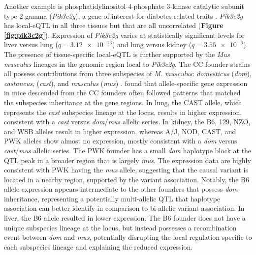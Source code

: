 \documentclass[9pt,twocolumn,twoside]{gsajnl}
\begin{document}
Another example is phosphatidylinositol-4-phosphate 3-kinase catalytic subunit type 2 gamma (\textit{Pik3c2g}), a gene of interest for diabetes-related traits \citep{Braccini2015}. \textit{Pik3c2g} has local-eQTL in all three tissues but that are all uncorrelated (\textbf{Figure \ref{fig:pik3c2g}}). Expression of \textit{Pik3c2g} varies at statistically significant levels for liver versus lung ($q = \num{3.12e-13}$) and lung versus kidney ($q = \num{3.55e-6}$). The presence of tissue-specific local-eQTL is further supported by the \textit{Mus musculus} lineages in the genomic region local to \textit{Pik3c2g}. The CC founder strains all possess contributions from three subspecies of \textit{M. musculus}: \textit{domesticus} (\textit{dom}), \textit{castaneus}, (\textit{cast}), and \textit{musculus} (\textit{mus}) \citep{Yang2011}. \cite{Crowley2015} found that allele-specific gene expression in mice descended from the CC founders often followed patterns that matched the subspecies inheritance at the gene regions.
In lung, the CAST allele, which represents the \textit{cast} subspecies lineage at the locus, results in higher expression, consistent with a \textit{cast} versus \textit{dom}/\textit{mus} allelic series. In kidney, the B6, 129, NZO, and WSB alleles result in higher expression, whereas A/J, NOD, CAST, and PWK alleles show almost no expression, mostly consistent with a \textit{dom} versus \textit{cast}/\textit{mus} allelic series. The PWK founder has a small \textit{dom} haplotype block at the QTL peak in a broader region that is largely \textit{mus}. The expression data are highly consistent with PWK having the \textit{mus} allele, suggesting that the causal variant is located in a nearby region, supported by the variant association. Notably, the B6 allele expression appears intermediate to the other founders that possess \textit{dom} inheritance, representing a potentially multi-allelic QTL that haplotype association can better identify in comparison to bi-allelic variant association. In liver, the B6 allele resulted in lower expression. The B6 founder does not have a unique subspecies lineage at the locus, but instead possesses a recombination event between \textit{dom} and \textit{mus}, potentially disrupting the local regulation specific to each subspecies lineage and explaining the reduced expression.

\end{document}
